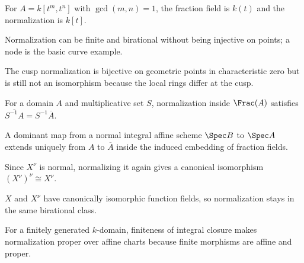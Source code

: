 \begin{example}\label{advex:vi28-01}
For $A=k[t^m,t^n]$ with $\gcd(m,n)=1$, the fraction field is $k(t)$ and the normalization is $k[t]$.
\end{example}

\begin{example}\label{advex:vi28-02}
Normalization can be finite and birational without being injective on points; a node is the basic curve example.
\end{example}

\begin{example}\label{advex:vi28-03}
The cusp normalization is bijective on geometric points in characteristic zero but is still not an isomorphism because the local rings differ at the cusp.
\end{example}

\begin{example}\label{advex:vi28-04}
For a domain $A$ and multiplicative set $S$, normalization inside $\Frac(A)$ satisfies $\overline{S^{-1}A}=S^{-1}\overline A$.
\end{example}

\begin{example}\label{advex:vi28-05}
A dominant map from a normal integral affine scheme $\Spec B$ to $\Spec A$ extends uniquely from $A$ to $\overline A$ inside the induced embedding of fraction fields.
\end{example}

\begin{example}\label{advex:vi28-06}
Since $X^\nu$ is normal, normalizing it again gives a canonical isomorphism $(X^\nu)^\nu\cong X^\nu$.
\end{example}

\begin{example}\label{advex:vi28-07}
$X$ and $X^\nu$ have canonically isomorphic function fields, so normalization stays in the same birational class.
\end{example}

\begin{example}\label{advex:vi28-08}
For a finitely generated $k$-domain, finiteness of integral closure makes normalization proper over affine charts because finite morphisms are affine and proper.
\end{example}

